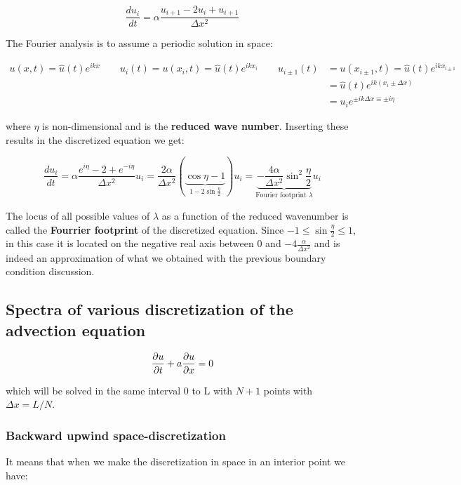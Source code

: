 \begin{equation}
\frac{d u_i}{dt}= \alpha \frac{u_{i+1} -2u_i + u_{i+1}}{\Delta x^2}
\end{equation}

The Fourier analysis is to assume a periodic solution in space: 

\begin{equation}
\begin{aligned}
u(x, t) = \hat{u}(t) e^{ikx} \qquad u_i( t) = u(x_i,t) =  \hat{u}(t) e^{ikx_i} \qquad u_{i\pm1}( t) &= u(x_{i\pm1},t) =  \hat{u}(t) e^{ikx_{i\pm1}}\\
&= \hat{u}(t) e^{ik(x_i \pm \Delta x)}\\
&= u_i e^{\pm ik\Delta x\equiv \pm i\eta}
\end{aligned}
\end{equation}

where $\eta$ is non-dimensional and is the \textbf{reduced wave number}. Inserting these results in the discretized equation we get:

\begin{equation}
\frac{d u_i}{dt}= \alpha \frac{e^{i\eta} -2 + e^{-i\eta}}{\Delta x^2}u_i = \frac{2\alpha}{\Delta x^2} (\underbrace{\cos \eta -1}_{1 - 2 \sin \frac{\eta}{2}}) u_i = \underbrace{-\frac{4\alpha }{\Delta x^2} \sin ^2 \frac{\eta}{2}}_{\mbox{Fourier footprint }\lambda} u_i
\end{equation}

The locus of all possible values of $\lambda$ as a function of the reduced wavenumber is called the \textbf{Fourrier footprint} of the discretized equation. Since $-1 \leq \sin \frac{\eta}{2} \leq 1$, in this case it is located on the negative real axis between 0 and $- 4\frac{\alpha}{\Delta x^2}$ and is indeed an approximation of what we obtained with the previous boundary condition discussion.  

\subsection{Spectra of various discretization of the advection equation}
\begin{equation}
\frac{\partial u}{\partial t} + a\frac{\partial u}{\partial x} = 0 
\end{equation}

which will be solved in the same interval 0 to L with $N+1$ points with $\Delta x = L / N$.

\subsubsection{Backward upwind space-discretization}
It means that when we make the discretization in space in an interior point we have: 

